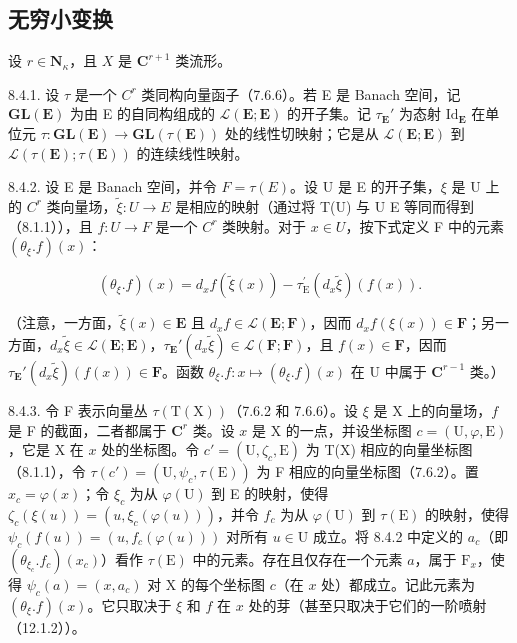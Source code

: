 \subsection{无穷小变换}

设 \(r \in \mathbf{N}_{\kappa}\)，且 \(X\) 是 \(\mathbf{C}^{r+1}\) 类流形。

8.4.1. 设 \(\tau\) 是一个 \(C^r\) 类同构向量函子（7.6.6）。若 E 是 Banach 空间，记 \(\mathbf{GL}(\mathbf{E})\) 为由 E 的自同构组成的 \(\mathcal{L}(\mathbf{E};\mathbf{E})\) 的开子集。记 \(\tau_{\mathbf{E}}'\) 为态射 \(\mathrm{Id}_{\mathbf{E}}\) 在单位元 \(\tau\colon\mathbf{GL}(\mathbf{E})\to\mathbf{GL}(\tau(\mathbf{E}))\) 处的线性切映射；它是从 \(\mathcal{L}(\mathbf{E};\mathbf{E})\) 到 \(\mathcal{L}(\tau(\mathbf{E});\tau(\mathbf{E}))\) 的连续线性映射。

8.4.2. 设 E 是 Banach 空间，并令 \(F = \tau(E)\)。设 U 是 E 的开子集，\(\xi\) 是 U 上的 \(C^r\) 类向量场，\(\tilde{\xi} \colon U \to E\) 是相应的映射（通过将 T(U) 与 U \times E 等同而得到（8.1.1）），且 \(f \colon U \to F\) 是一个 \(C^r\) 类映射。对于 \(x \in U\)，按下式定义 F 中的元素 \((\theta_\xi.f)(x)\)：

\[
(\theta_ {\xi}. f) (x) = d _ {x} f (\tilde {\xi} (x)) - \tau_ {\mathrm{E}} ^ {\prime} (d _ {x} \tilde {\xi}) (f (x)).\tag{1}
\]

（注意，一方面，\(\tilde{\xi}(x) \in \mathbf{E}\) 且 \(d_x f \in \mathcal{L}(\mathbf{E}; \mathbf{F})\)，因而 \(d_x f(\xi(x)) \in \mathbf{F}\)；另一方面，\(d_x \tilde{\xi} \in \mathcal{L}(\mathbf{E}; \mathbf{E})\)，\(\tau_{\mathbf{E}}'(d_x \tilde{\xi}) \in \mathcal{L}(\mathbf{F}; \mathbf{F})\)，且 \(f(x) \in \mathbf{F}\)，因而 \(\tau_{\mathbf{E}}'(d_x \tilde{\xi})(f(x)) \in \mathbf{F}\)。函数 \(\theta_{\xi}.f: x \mapsto (\theta_{\xi}.f)(x)\) 在 U 中属于 \(\mathbf{C}^{r-1}\) 类。）

8.4.3. 令 F 表示向量丛 \(\tau(\mathrm{T}(\mathrm{X}))\)（7.6.2 和 7.6.6）。设 \(\xi\) 是 X 上的向量场，\(f\) 是 F 的截面，二者都属于 \(\mathbf{C}^r\) 类。设 \(x\) 是 X 的一点，并设坐标图 \(c = (\mathrm{U}, \varphi, \mathrm{E})\)，它是 X 在 \(x\) 处的坐标图。令 \(c' = (\mathrm{U}, \zeta_c, \mathrm{E})\) 为 T(X) 相应的向量坐标图（8.1.1），令 \(\tau(c') = (\mathrm{U}, \psi_c, \tau(\mathrm{E}))\) 为 F 相应的向量坐标图（7.6.2）。置 \(x_c = \varphi(x)\)；令 \(\xi_c\) 为从 \(\varphi(\mathrm{U})\) 到 E 的映射，使得 \(\zeta_c(\xi(u)) = (u, \xi_c(\varphi(u)))\)，并令 \(f_c\) 为从 \(\varphi(\mathrm{U})\) 到 \(\tau(\mathrm{E})\) 的映射，使得 \(\psi_c(f(u)) = (u, f_c(\varphi(u)))\) 对所有 \(u \in \mathrm{U}\) 成立。将 8.4.2 中定义的 \(a_c\)（即 \((\theta_{\xi_c}.f_c)(x_c)\)）看作 \(\tau(\mathrm{E})\) 中的元素。存在且仅存在一个元素 \(a\)，属于 \(\mathrm{F}_x\)，使得 \(\psi_c(a) = (x, a_c)\) 对 X 的每个坐标图 \(c\)（在 \(x\) 处）都成立。记此元素为 \((\theta_\xi.f)(x)\)。它只取决于 \(\xi\) 和 \(f\) 在 \(x\) 处的芽（甚至只取决于它们的一阶喷射（12.1.2））。

